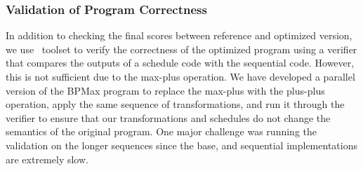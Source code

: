 \subsubsection{Validation of Program Correctness}
In addition to checking the final scores between reference and optimized version, we use \alphaz\ toolset to verify the correctness of the optimized program using a verifier that compares the outputs of a schedule code with the sequential code. However, this is not sufficient due to the max-plus operation. We have developed a parallel version of the BPMax program to replace the max-plus with the plus-plus operation, apply the same sequence of transformations, and run it through the verifier to ensure that our transformations and schedules do not change the semantics of the original program. One major challenge was running the validation on the longer sequences since the base, and sequential implementations are extremely slow.